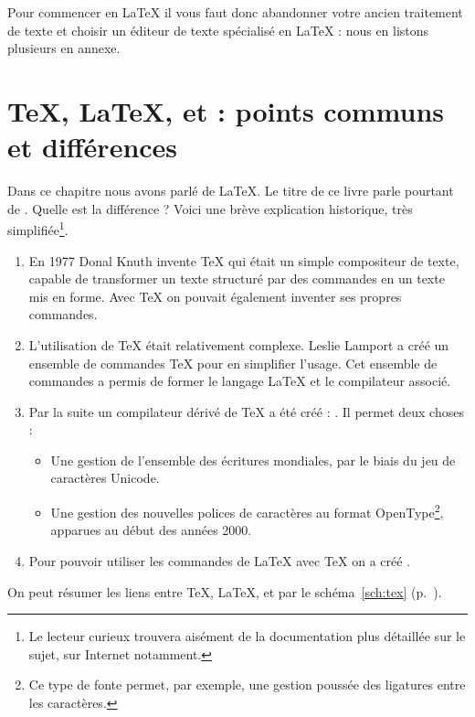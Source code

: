 Pour commencer en \LaTeX{} il vous faut donc abandonner votre ancien traitement de texte et choisir un éditeur de texte spécialisé en \LaTeX{} : nous en listons plusieurs en annexe.

\section[TeX, LaTeX, XeTeX, XeLaTeX : points communs et différences]{\TeX{}, \LaTeX{}, \XeTeX{} et \XeLaTeX{} : points communs et différences}\label{TeXLaTeX}

Dans ce chapitre nous avons parlé de \LaTeX{}. Le titre de ce livre parle pourtant  de \XeLaTeX{}. Quelle est la différence ? Voici une brève explication historique, très simplifiée\footnote{Le lecteur curieux trouvera aisément de la documentation plus détaillée sur le sujet, sur Internet notamment.}.

\begin{enumerate}
\item En 1977 Donal Knuth invente  \TeX{} qui était un simple compositeur de texte, capable de transformer un texte structuré par des commandes en un texte mis en forme. Avec \TeX{} on pouvait également inventer ses propres commandes.
\item L'utilisation de \TeX{} était relativement complexe. Leslie Lamport a créé un ensemble de commandes \TeX{} pour en simplifier l'usage. Cet ensemble de commandes a permis de former le langage \LaTeX{} et le compilateur associé.
\item Par la suite un compilateur dérivé de \TeX{} a été créé : \XeTeX{}. Il permet deux choses :
\begin{itemize}
	\item Une gestion  de l'ensemble des écritures mondiales, par le biais du jeu de caractères Unicode.
	\item Une gestion des nouvelles polices de caractères au format OpenType\footnote{Ce type de fonte permet, par exemple, une gestion poussée des ligatures entre les caractères.}, apparues au début des années 2000.

\end{itemize} 
\item Pour pouvoir utiliser les commandes de \LaTeX{} avec \TeX{} on a créé \XeLaTeX{}.
\end{enumerate}

On peut résumer les liens entre \TeX{}, \LaTeX{}, \XeTeX{} et \XeLaTeX{} par le schéma~\ref{sch:tex} (p.~\pageref{sch:tex}).

